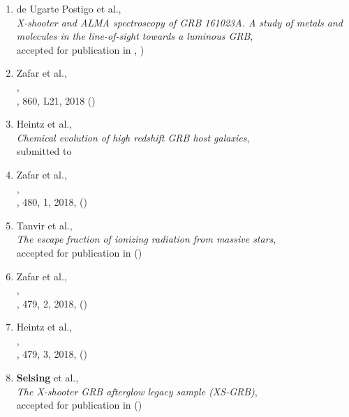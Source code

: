 \begin{enumerate}
\item de Ugarte Postigo et al., \\
{\it X-shooter and ALMA spectroscopy of GRB 161023A.
	A study of metals and molecules in the line-of-sight towards a luminous GRB}, \\
	accepted for publication in \aanda, )

\item Zafar et al., \\
, \\
 \apjl, 860,  L21, 2018 ()

\item Heintz et al., \\
	{\it Chemical evolution of high redshift GRB host galaxies}, \\
	submitted to \aanda

\item Zafar et al., \\
, \\
\mnras, 480, 1, 2018, ()


\item Tanvir et al., \\
	{\it The escape fraction of ionizing radiation from massive stars}, \\
	accepted for publication in \mnras ()

\item Zafar et al., \\
	, \\
	\mnras, 479, 2, 2018, ()

\item Heintz et al., \\
	, \\
	\mnras, 479, 3, 2018, ()

\item \textbf{Selsing} et al., \\
	{\it The X-shooter GRB afterglow legacy sample (XS-GRB)}, \\
	accepted for publication in \aanda ()



\end{enumerate}
